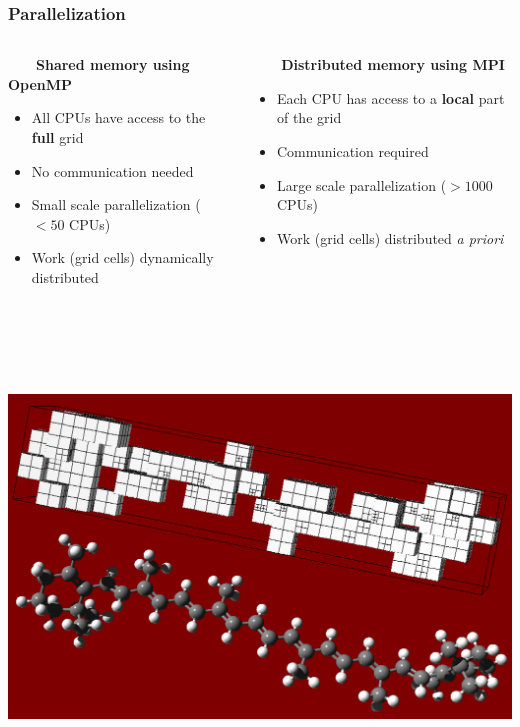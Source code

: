 \begin{frame}
    \frametitle{Parallelization}
    \begin{columns}
    \begin{column}{.5\textwidth}
	\ \ \ \ \textbf{Shared memory using OpenMP}
	\begin{itemize}
	    \item All CPUs have access to the \textbf{full} grid
	    \item No communication needed
	    \item Small scale parallelization ($<50$ CPUs)
	    \item Work (grid cells) dynamically distributed
	\end{itemize}
    \end{column}
    \begin{column}{.5\textwidth}
	\ \ \ \ \textbf{Distributed memory using MPI}
	\begin{itemize}
	    \item Each CPU has access to a \textbf{local} part of the grid
	    \item Communication required
	    \item Large scale parallelization ($>1000$ CPUs)
	    \item Work (grid cells) distributed \it{a priori}
	\end{itemize}
    \end{column}
    \end{columns}
    \ \\
    \ \\
    \ \\
    \ \\
    \centering
    \includegraphics[angle=0, scale=0.2]{figures/caroteneGrid.pdf}
\end{frame}

